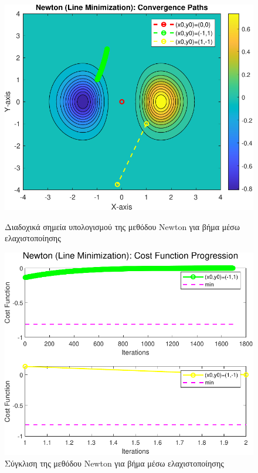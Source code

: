 \documentclass[a4paper,12pt]{article}
\begin{document}
\begin{figure}[h]
    \centering
    \begin{minipage}{0.47\textwidth}
        \centering
        \includegraphics[width=1\linewidth]{plot/newton_line_minimization_contour.pdf}
        \caption{\small Διαδοχικά σημεία υπολογισμού της μεθόδου  Newton  για βήμα μέσω ελαχιστοποίησης}
        \label{fig:newton_line_minimization_contour}
    \end{minipage} \hfill
    \begin{minipage}{0.47\textwidth}
        \centering
        \includegraphics[width=1\linewidth]{plot/newton_line_minimization_costs.pdf}
        \caption{\small Σύγκλιση της μεθόδου  Newton  για βήμα μέσω ελαχιστοποίησης}
        \label{fig:newton_line_minimization_costs}
    \end{minipage}
\end{figure}
\end{document}
